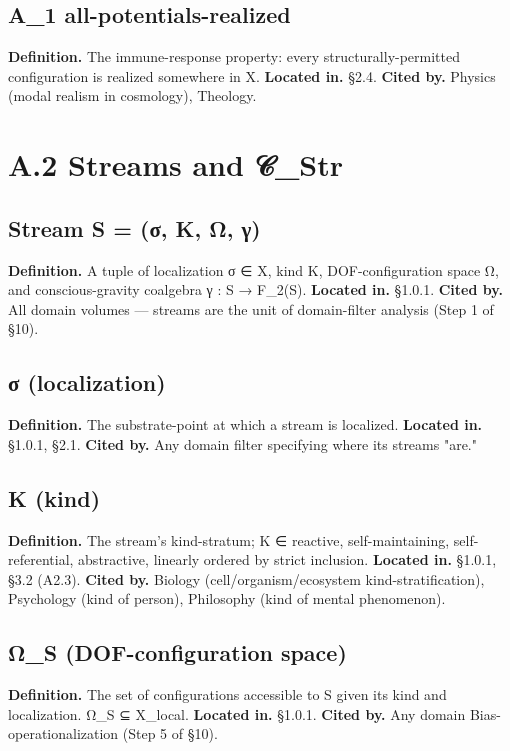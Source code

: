 \documentclass[11pt, openany]{book}
\newcommand{\sectionbreak}{\clearpage}
\begin{document}
\subsection{A\_\allowbreak{}1 all-potentials-realized}
\textbf{Definition.} The immune-response property: every structurally-permitted configuration is realized somewhere in X.
\textbf{Located in.} §2.4.
\textbf{Cited by.} Physics (modal realism in cosmology), Theology.

\sectionbreak

\section{A.2 Streams and 𝒞\_\allowbreak{}Str}

\subsection{Stream S = (σ, K, Ω, γ)}
\textbf{Definition.} A tuple of localization σ ∈ X, kind K, DOF-configuration space Ω, and conscious-gravity coalgebra γ : S → F\_\allowbreak{}2(S).
\textbf{Located in.} §1.0.1.
\textbf{Cited by.} All domain volumes --- streams are the unit of domain-filter analysis (Step 1 of §10).

\subsection{σ (localization)}
\textbf{Definition.} The substrate-point at which a stream is localized.
\textbf{Located in.} §1.0.1, §2.1.
\textbf{Cited by.} Any domain filter specifying where its streams "are."

\subsection{K (kind)}
\textbf{Definition.} The stream's kind-stratum; K ∈ {reactive, self-maintaining, self-referential, abstractive}, linearly ordered by strict inclusion.
\textbf{Located in.} §1.0.1, §3.2 (A2.3).
\textbf{Cited by.} Biology (cell/organism/ecosystem kind-stratification), Psychology (kind of person), Philosophy (kind of mental phenomenon).

\subsection{Ω\_\allowbreak{}S (DOF-configuration space)}
\textbf{Definition.} The set of configurations accessible to S given its kind and localization. Ω\_\allowbreak{}S ⊆ X\_\allowbreak{}local.
\textbf{Located in.} §1.0.1.
\textbf{Cited by.} Any domain Bias-operationalization (Step 5 of §10).
\end{document}
